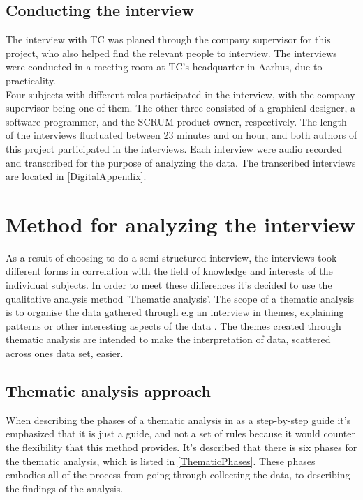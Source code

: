 \subsection{Conducting the interview}
\label{ConductingInterview}
The interview with TC was planed through the company supervisor for this project, who also helped find the relevant people to interview. The interviews were conducted in a meeting room at TC's headquarter in Aarhus, due to practicality.\\
Four subjects with different roles participated in the interview, with the company supervisor being one of them. The other three consisted of a graphical designer, a software programmer, and the SCRUM product owner, respectively. The length of the interviews fluctuated between 23 minutes and on hour, and both authors of this project participated in the interviews. Each interview were audio recorded and transcribed for the purpose of analyzing the data. The transcribed interviews are located in \autoref{DigitalAppendix}.

\section{Method for analyzing the interview}
\label{InterviewAnalysis}
As a result of choosing to do a semi-structured interview, the interviews took different forms in correlation with the field of knowledge and interests of the individual subjects. In order to meet these differences it's decided to use the qualitative analysis method 'Thematic analysis'. The scope of a thematic analysis is to organise the data gathered through e.g an interview in themes, explaining patterns or other interesting aspects of the data \parencite{PDF:Braun2006}. The themes created through thematic analysis are intended to make the interpretation of data, scattered across ones data set, easier. 

\subsection{Thematic analysis approach}
\label{ThematicAnalysisApproach}
When describing the phases of a thematic analysis in \parencite[86]{PDF:Braun2006} as a step-by-step guide it's emphasized that it is just a guide, and not a set of rules because it would counter the flexibility that this method provides. It's described that there is six phases for the thematic analysis, which is listed in \autoref{ThematicPhases}. These phases embodies all of the process from going through collecting the data, to describing the findings of the analysis.

